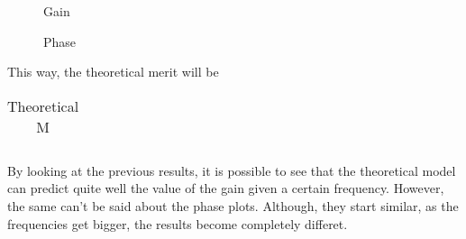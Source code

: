   \begin{figure}[h]
     \centering
     \caption{Gain}
     \label{gain}
 \end{figure}
 
\vspace{0.5cm}
 

\begin{figure}[H]
    \centering
{}
  \hfill
{}
\end{figure}

  \begin{figure}[h]
     \centering
     \caption{Phase}
     \label{phase}
 \end{figure}
 
 
 \vspace{1cm}

This way, the theoretical merit will be

\begin{table}[h]
  \centering
  \begin{tabular}{|l|r|}
    \hline    
    
  \end{tabular}
  \caption{Theoretical M}
  \label{tab:info}
\end{table}

By looking at the previous results, it is possible to see that the theoretical model can predict quite well the value of the gain given a certain frequency. However, the same can't be said about the phase plots. Although, they start similar, as the frequencies get bigger, the results become completely differet.
